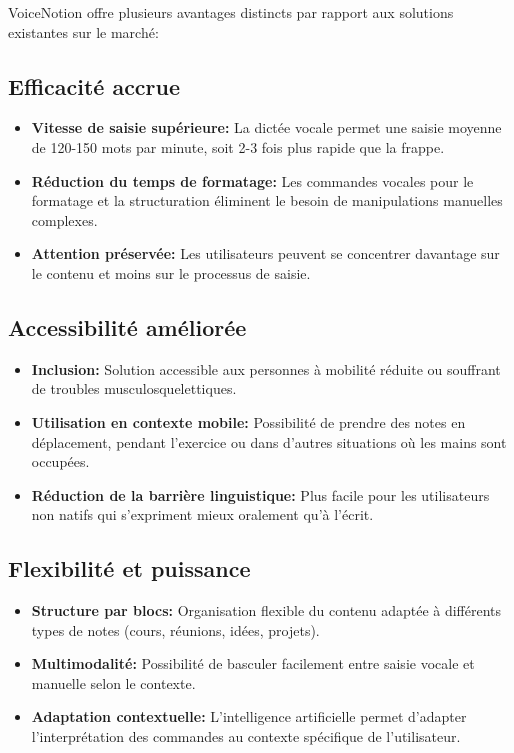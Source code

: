 VoiceNotion offre plusieurs avantages distincts par rapport aux solutions existantes sur le marché:

\subsection{Efficacité accrue}

\begin{itemize}
    \item \textbf{Vitesse de saisie supérieure:} La dictée vocale permet une saisie moyenne de 120-150 mots par minute, soit 2-3 fois plus rapide que la frappe.
    
    \item \textbf{Réduction du temps de formatage:} Les commandes vocales pour le formatage et la structuration éliminent le besoin de manipulations manuelles complexes.
    
    \item \textbf{Attention préservée:} Les utilisateurs peuvent se concentrer davantage sur le contenu et moins sur le processus de saisie.
\end{itemize}

\subsection{Accessibilité améliorée}

\begin{itemize}
    \item \textbf{Inclusion:} Solution accessible aux personnes à mobilité réduite ou souffrant de troubles musculosquelettiques.
    
    \item \textbf{Utilisation en contexte mobile:} Possibilité de prendre des notes en déplacement, pendant l'exercice ou dans d'autres situations où les mains sont occupées.
    
    \item \textbf{Réduction de la barrière linguistique:} Plus facile pour les utilisateurs non natifs qui s'expriment mieux oralement qu'à l'écrit.
\end{itemize}

\subsection{Flexibilité et puissance}

\begin{itemize}
    \item \textbf{Structure par blocs:} Organisation flexible du contenu adaptée à différents types de notes (cours, réunions, idées, projets).
    
    \item \textbf{Multimodalité:} Possibilité de basculer facilement entre saisie vocale et manuelle selon le contexte.
    
    \item \textbf{Adaptation contextuelle:} L'intelligence artificielle permet d'adapter l'interprétation des commandes au contexte spécifique de l'utilisateur.
\end{itemize}

